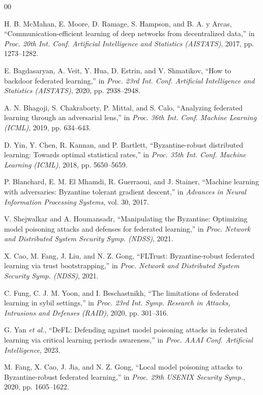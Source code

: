 \documentclass[conference,9pt]{IEEEtran}
\begin{document}
\begin{thebibliography}{00}

H. B. McMahan, E. Moore, D. Ramage, S. Hampson, and B. A. y Arcas, ``Communication-efficient learning of deep networks from decentralized data,'' in \emph{Proc. 20th Int. Conf. Artificial Intelligence and Statistics (AISTATS)}, 2017, pp. 1273--1282.

E. Bagdasaryan, A. Veit, Y. Hua, D. Estrin, and V. Shmatikov, ``How to backdoor federated learning,'' in \emph{Proc. 23rd Int. Conf. Artificial Intelligence and Statistics (AISTATS)}, 2020, pp. 2938--2948.

A. N. Bhagoji, S. Chakraborty, P. Mittal, and S. Calo, ``Analyzing federated learning through an adversarial lens,'' in \emph{Proc. 36th Int. Conf. Machine Learning (ICML)}, 2019, pp. 634--643.

D. Yin, Y. Chen, R. Kannan, and P. Bartlett, ``Byzantine-robust distributed learning: Towards optimal statistical rates,'' in \emph{Proc. 35th Int. Conf. Machine Learning (ICML)}, 2018, pp. 5650--5659.

P. Blanchard, E. M. El Mhamdi, R. Guerraoui, and J. Stainer, ``Machine learning with adversaries: Byzantine tolerant gradient descent,'' in \emph{Advances in Neural Information Processing Systems}, vol. 30, 2017.

V. Shejwalkar and A. Houmansadr, ``Manipulating the Byzantine: Optimizing model poisoning attacks and defenses for federated learning,'' in \emph{Proc. Network and Distributed System Security Symp. (NDSS)}, 2021.

X. Cao, M. Fang, J. Liu, and N. Z. Gong, ``FLTrust: Byzantine-robust federated learning via trust bootstrapping,'' in \emph{Proc. Network and Distributed System Security Symp. (NDSS)}, 2021.

C. Fung, C. J. M. Yoon, and I. Beschastnikh, ``The limitations of federated learning in sybil settings,'' in \emph{Proc. 23rd Int. Symp. Research in Attacks, Intrusions and Defenses (RAID)}, 2020, pp. 301--316.

G. Yan \emph{et al.}, ``DeFL: Defending against model poisoning attacks in federated learning via critical learning periods awareness,'' in \emph{Proc. AAAI Conf. Artificial Intelligence}, 2023.

M. Fang, X. Cao, J. Jia, and N. Z. Gong, ``Local model poisoning attacks to Byzantine-robust federated learning,'' in \emph{Proc. 29th USENIX Security Symp.}, 2020, pp. 1605--1622.


\end{thebibliography}
\end{document}

